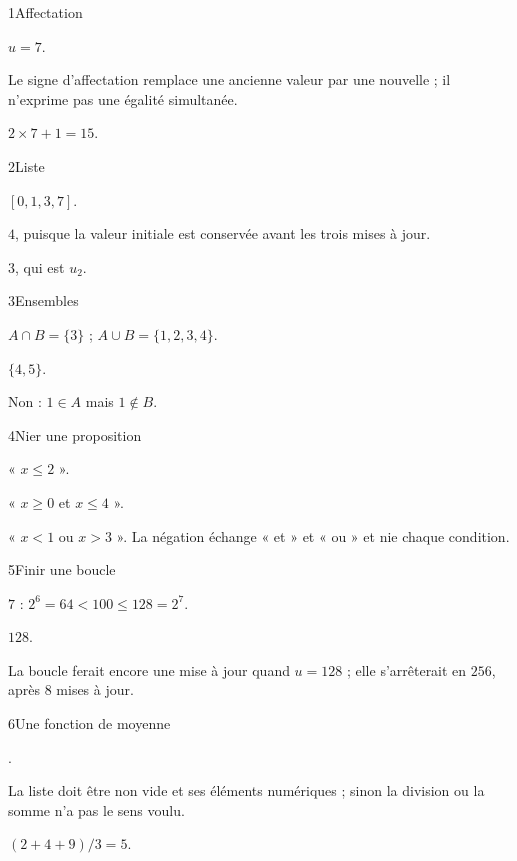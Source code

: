 \begin{corrige}{1}{Affectation}
\begin{questions}
\item $u=7$.
\item Le signe d’affectation remplace une ancienne valeur par une nouvelle ; il n’exprime pas une égalité simultanée.
\item $2\times7+1=15$.
\end{questions}
\end{corrige}
\begin{corrige}{2}{Liste}
\begin{questions}
\item $[0,1,3,7]$.
\item $4$, puisque la valeur initiale est conservée avant les trois mises à jour.
\item $3$, qui est $u_2$.
\end{questions}
\end{corrige}
\begin{corrige}{3}{Ensembles}
\begin{questions}
\item $A\cap B=\{3\}$ ; $A\cup B=\{1,2,3,4\}$.
\item $\{4,5\}$.
\item Non : $1\in A$ mais $1\notin B$.
\end{questions}
\end{corrige}
\begin{corrige}{4}{Nier une proposition}
\begin{questions}
\item « $x\leq2$ ».
\item « $x\geq0$ et $x\leq4$ ».
\item « $x<1$ ou $x>3$ ». La négation échange « et » et « ou » et nie chaque condition.
\end{questions}
\end{corrige}
\begin{corrige}{5}{Finir une boucle}
\begin{questions}
\item $7$ : $2^6=64<100\leq128=2^7$.
\item $128$.
\item La boucle ferait encore une mise à jour quand $u=128$ ; elle s’arrêterait en $256$, après $8$ mises à jour.
\end{questions}
\end{corrige}
\begin{corrige}{6}{Une fonction de moyenne}
\begin{questions}
\item {}.
\item La liste doit être non vide et ses éléments numériques ; sinon la division ou la somme n’a pas le sens voulu.
\item $(2+4+9)/3=5$.
\end{questions}
\end{corrige}
